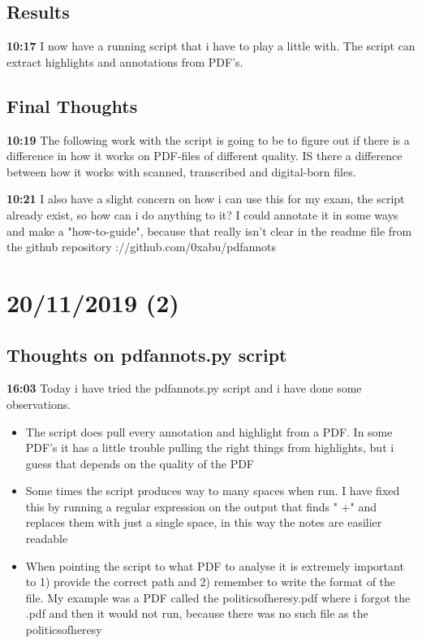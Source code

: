 \documentclass{article}
\begin{document}
\subsection{Results}
\textbf{10:17} I now have a running script that i have to play a little with. The script can extract highlights and annotations from PDF's. 
\subsection{Final Thoughts}
\textbf{10:19} The following work with the script is going to be to figure out if there is a difference in how it works on PDF-files of different quality. IS there a difference between how it works with scanned, transcribed and digital-born files.

\textbf{10:21} I also have a slight concern on how i can use this for my exam, the script already exist, so how can i do anything to it? I could annotate it in some ways and make a "how-to-guide", because that really isn't clear in the readme file from the github repository \linkhttps://github.com/0xabu/pdfannots

\section{20/11/2019 (2)}
\subsection{Thoughts on pdfannots.py script}
\textbf{16:03} Today i have tried the pdfannots.py script and i have done some observations.
\begin{itemize}
    \item The script does pull every annotation and highlight from a PDF. In some PDF's it has a little trouble pulling the right things from highlights, but i guess that depends on the quality of the PDF
    \item Some times the script produces way to many spaces when run. I have fixed this by running a regular expression on the output that finds " +" and replaces them with just a single space, in this way the notes are easilier readable
    \item When pointing the script to what PDF to analyse it is extremely important to 1) provide the correct path and 2) remember to write the format of the file. My example was a PDF called the\textunderscore
    politics\textunderscore of\textunderscore heresy.pdf where i forgot the .pdf and then it would not run, because there was no such file as the\textunderscore
    politics\textunderscore of\textunderscore heresy
    
\end{itemize}
\end{document}
